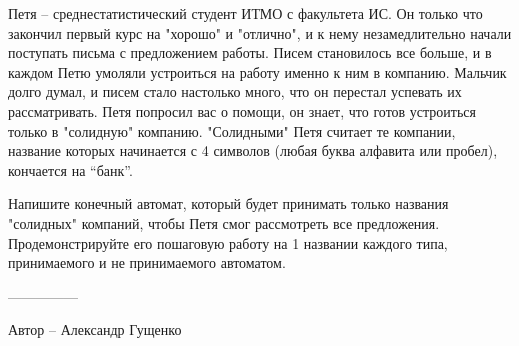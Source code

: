 \question
Петя -- среднестатистический студент ИТМО с факультета ИС. Он только что закончил первый курс на "хорошо" и "отлично", и к нему незамедлительно начали поступать письма с предложением работы. Писем становилось все больше, и в каждом Петю умоляли устроиться на работу именно к ним в компанию. Мальчик долго думал, и писем стало настолько много, что он перестал успевать их рассматривать. Петя попросил вас о помощи, он знает, что готов устроиться только в "солидную" компанию. "Солидными" Петя считает те компании, название которых начинается с 4 символов (любая буква алфавита или пробел), кончается на “банк”. 

Напишите конечный автомат, который будет принимать только названия "солидных" компаний, чтобы Петя смог рассмотреть все предложения. Продемонстрируйте его пошаговую работу на 1 названии каждого типа, принимаемого и не принимаемого автоматом.

---------------

Автор -- Александр Гущенко
